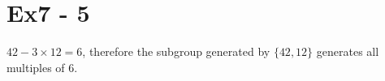 \section*{Ex7 - 5}
$ 42 - 3 \times 12 = 6 $, therefore the subgroup generated by $ \{42, 12\} $ generates all multiples of 6.